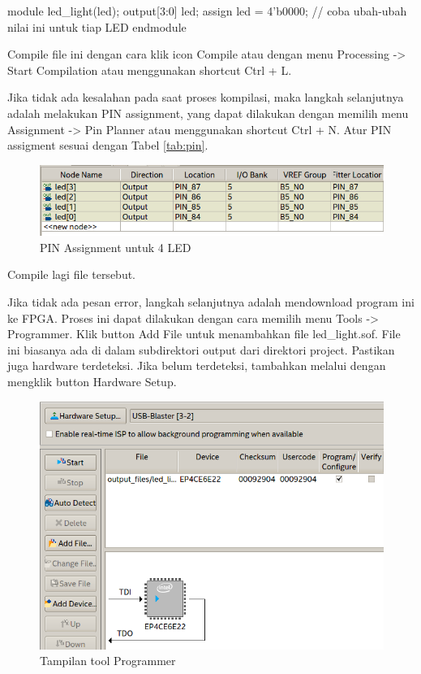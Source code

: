 \documentclass[a4paper,11pt,bahasa]{extarticle}
\begin{document}
{
\begin{verilogcode}
module led_light(led);
  output[3:0] led;
  assign led = 4'b0000; // coba ubah-ubah nilai ini untuk tiap LED
endmodule
\end{verilogcode}
}

Compile file ini dengan cara klik icon {\sf Compile} atau dengan menu
{\sf Processing -> Start Compilation} atau menggunakan shortcut
{\sf Ctrl + L}.

Jika tidak ada kesalahan pada saat proses kompilasi,
maka langkah selanjutnya adalah melakukan
PIN assignment, yang dapat dilakukan dengan memilih menu
{\sf Assignment -> Pin Planner} atau menggunakan shortcut
{\sf Ctrl + N}. Atur PIN assigment sesuai dengan Tabel \ref{tab:pin}.

\begin{figure}[H]
\centering
\includegraphics[scale=0.5]{images/PinPlanner_4LED.png}
\par
\caption{PIN Assignment untuk 4 LED}
\end{figure}

Compile lagi file tersebut.

Jika tidak ada pesan error, langkah selanjutnya adalah mendownload program
ini ke FPGA. Proses ini dapat dilakukan dengan cara memilih menu
{\sf Tools -> Programmer}.
Klik button {\sf Add File} untuk menambahkan file {\sf led\_light.sof}.
File ini biasanya ada di dalam subdirektori {\sf output} dari direktori
project.
Pastikan juga hardware terdeteksi. Jika belum terdeteksi, tambahkan melalui
dengan mengklik button {\sf Hardware Setup}.

\begin{figure}[H]
\centering
\includegraphics[scale=0.6]{images/Programmer_4LED.png}
\par
\caption{Tampilan tool {\sf Programmer}}
\end{figure}
\end{document}
